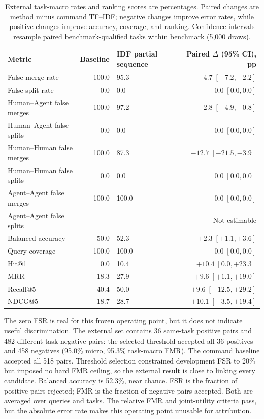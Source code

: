 \begin{table}[t]
\centering
\small
\setlength{\tabcolsep}{6pt}
\begin{tabularx}{\linewidth}{l r X r}
\toprule
Metric & Baseline & IDF partial sequence & Paired $\Delta$ (95\% CI), pp \\
\midrule
False-merge rate & 100.0 & 95.3 & $-4.7\;[-7.2,-2.2]$ \\
False-split rate & 0.0 & 0.0 & $0.0\;[0.0,0.0]$ \\
Human--Agent false merges & 100.0 & 97.2 & $-2.8\;[-4.9,-0.8]$ \\
Human--Agent false splits & 0.0 & 0.0 & $0.0\;[0.0,0.0]$ \\
Human--Human false merges & 100.0 & 87.3 & $-12.7\;[-21.5,-3.9]$ \\
Human--Human false splits & 0.0 & 0.0 & $0.0\;[0.0,0.0]$ \\
Agent--Agent false merges & 100.0 & 100.0 & $0.0\;[0.0,0.0]$ \\
Agent--Agent false splits & -- & -- & Not estimable \\
Balanced accuracy & 50.0 & 52.3 & $+2.3\;[+1.1,+3.6]$ \\
Query coverage & 100.0 & 100.0 & $0.0\;[0.0,0.0]$ \\
Hit@1 & 0.0 & 10.4 & $+10.4\;[0.0,+23.3]$ \\
MRR & 18.3 & 27.9 & $+9.6\;[+1.1,+19.0]$ \\
Recall@5 & 40.4 & 50.0 & $+9.6\;[-12.5,+29.2]$ \\
NDCG@5 & 18.7 & 28.7 & $+10.1\;[-3.5,+19.4]$ \\
\bottomrule
\end{tabularx}
\caption{External task-macro rates and ranking scores are percentages. Paired changes are method minus command TF--IDF; negative changes improve error rates, while positive changes improve accuracy, coverage, and ranking. Confidence intervals resample paired benchmark-qualified tasks within benchmark (5,000 draws).}
\label{tab:multidimensional-rerun}
\end{table}

The zero FSR is real for this frozen operating point, but it does not indicate useful discrimination. The external set contains 36 same-task positive pairs and 482 different-task negative pairs: the selected threshold accepted all 36 positives and 458 negatives (95.0\% micro, 95.3\% task-macro FMR). The command baseline accepted all 518 pairs. Threshold selection constrained development FSR to 20\% but imposed no hard FMR ceiling, so the external result is close to linking every candidate. Balanced accuracy is 52.3\%, near chance. FSR is the fraction of positive pairs rejected; FMR is the fraction of negative pairs accepted. Both are averaged over queries and tasks. The relative FMR and joint-utility criteria pass, but the absolute error rate makes this operating point unusable for attribution.

